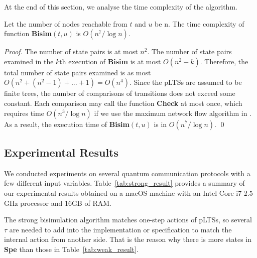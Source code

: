 \documentclass[runningheads]{llncs}
\begin{document}
At the end of this section, we analyse the time complexity of the algorithm.

\begin{theorem}[Complexity]\label{thm:strong_alg_complexity}
Let the number of nodes reachable from $t$ and $u$ be n. The time complexity of function \textbf{Bisim}$(t,u)$ is $O(n^7/\log{n})$. %
\end{theorem}
\begin{proof}
The number of state pairs is at most $n^2$. The number of state pairs examined in the $k$th execution of \textbf{Bisim} is at most $O(n^2-k)$. Therefore, the total number of state pairs examined is as most $O(n^2+(n^2-1)+...+1)=O(n^4)$. Since the pLTSs are assumed to be finite trees, the number of comparisons of transitions does not exceed some constant. Each comparison may call the function \textbf{Check} at most once, which requires time $O(n^3/\log{n})$ if we use the maximum network flow algorithm in \cite{CHM90}. As a result, the execution time of \textbf{Bisim}$(t,u)$ is in $O(n^7/\log{n})$.
\qed
\end{proof}

\subsection{Experimental Results}\label{sec:strong_bisim_exper}
We conducted experiments on several quantum communication protocols with a few different input variables.  
Table~\ref{tab:strong_result} provides a summary of our experimental results obtained on a macOS machine with an Intel Core i7 2.5 GHz processor and 16GB of RAM. 

The strong bisimulation algorithm matches one-step actions of pLTSs, so several $\tau$ are needed to add into the implementation or specification to match the internal action from another side. That is the reason why there is more states in \textbf{Spe} than those in Table~\ref{tab:weak_result}.
\end{document}
